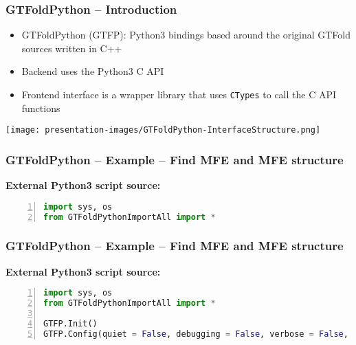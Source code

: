 \documentclass[usenames,svgnames,dvipsnames,11pt]{beamer}
\begin{document}
\begin{frame}
\frametitle{GTFoldPython -- Introduction}

\begin{itemize} 

\item GTFoldPython (GTFP): Python3 bindings based around the 
      original GTFold sources written in C++
\item Backend uses the Python3 C API 
\item Frontend interface is a wrapper library that uses 
      \texttt{CTypes} to call the C API functions

\end{itemize}

\begin{center}
\texttt{[image: presentation-images/GTFoldPython-InterfaceStructure.png]}
\end{center}

\end{frame}

\begin{frame}[t,fragile]
\frametitle{GTFoldPython -- Example -- Find MFE and MFE structure}

\small\noindent
\textbf{External Python3 script source:}
\begin{lstlisting}[language=Python,basicstyle=\tiny\ttfamily,keywordstyle=\bfseries\color{green!40!black},
                   commentstyle=\itshape\color{purple!40!black},identifierstyle=\color{blue!63!green},
                   stringstyle=\color{orange},frame=none,keepspaces=true,numbers=left,xleftmargin=0.28cm]
import sys, os
from GTFoldPythonImportAll import *
\end{lstlisting}

\end{frame}

\begin{frame}[t,fragile]
\frametitle{GTFoldPython -- Example -- Find MFE and MFE structure}

\small\noindent
\textbf{External Python3 script source:}
\begin{lstlisting}[language=Python,basicstyle=\tiny\ttfamily,keywordstyle=\bfseries\color{green!40!black},
                   commentstyle=\itshape\color{purple!40!black},identifierstyle=\color{blue!63!green},
                   stringstyle=\color{orange},frame=none,keepspaces=true,numbers=left,xleftmargin=0.28cm]
import sys, os
from GTFoldPythonImportAll import *

GTFP.Init()
GTFP.Config(quiet = False, debugging = False, verbose = False, stdmsgout = "stderr")
\end{lstlisting}

\end{frame}
\end{document}
